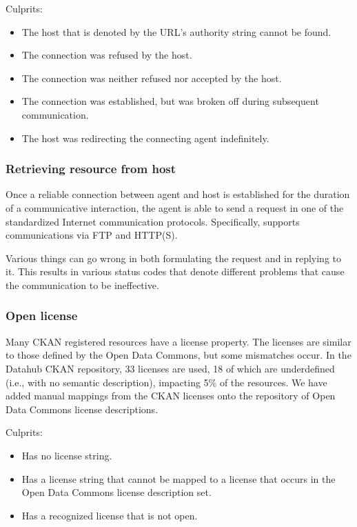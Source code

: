 Culprits:
\begin{itemize}[noitemsep,nolistsep]
\item The host that is denoted by the URL's authority string cannot be found.
\item The connection was refused by the host.
\item The connection was neither refused nor accepted by the host.
\item The connection was established, but was broken off
      during subsequent communication.
\item The host was redirecting the connecting agent indefinitely.
\end{itemize}

\subsubsection*{Retrieving resource from host}

Once a reliable connection between agent and host is established
 for the duration of a communicative interaction,
 the agent is able to send a request in one of
 the standardized Internet communication protocols.
Specifically, \obs supports communications via FTP and HTTP(S).

Various things can go wrong in both formulating the request and
 in replying to it.
This results in various status codes that denote different problems
 that cause the communication to be ineffective.

\subsubsection*{Open license}

Many CKAN registered resources have a license property.
The licenses are similar to those defined by the Open Data Commons,
 but some mismatches occur.
In the Datahub CKAN repository, 33 licenses are used,
 18 of which are underdefined (i.e., with no semantic description),
 impacting 5\% of the resources.
We have added manual mappings from the CKAN licenses onto
 the repository of Open Data Commons license descriptions.

Culprits:
\begin{itemize}[noitemsep,nolistsep]
\item Has no license string.
\item Has a license string that cannot be mapped to
       a license that occurs in
       the Open Data Commons license description set.
\item Has a recognized license that is not open.
\end{itemize}

